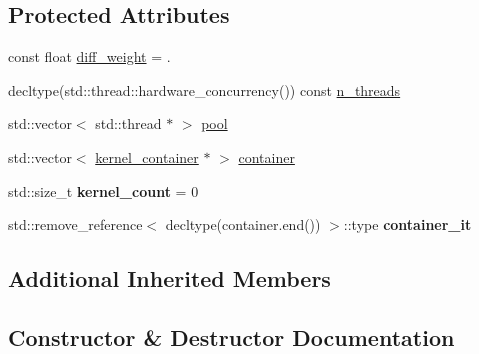 \subsection*{Protected Attributes}
\begin{DoxyCompactItemize}
\item 
const float \hyperlink{classpool__schedule_ad58df45d8f29a1a696338a2beb058b7c}{diff\+\_\+weight} = .
\item 
decltype(std\+::thread\+::hardware\+\_\+concurrency()) const \hyperlink{classpool__schedule_adc11766f8ff9a29b21318bfcf81c815d}{n\+\_\+threads}
\item 
std\+::vector$<$ std\+::thread $\ast$ $>$ \hyperlink{classpool__schedule_ae13c48902fd23d0d8747978780731a04}{pool}
\item 
std\+::vector$<$ \hyperlink{classkernel__container}{kernel\+\_\+container} $\ast$ $>$ \hyperlink{classpool__schedule_a06a6ffb1893da4d486e309f22fe3d83e}{container}
\item 
\hypertarget{classpool__schedule_a91f4b1e58cbbe08986c21d1286f3f98b}{}std\+::size\+\_\+t {\bfseries kernel\+\_\+count} = 0\label{classpool__schedule_a91f4b1e58cbbe08986c21d1286f3f98b}

\item 
\hypertarget{classpool__schedule_a7255a60e82c01a13c18ae69c8831f288}{}std\+::remove\+\_\+reference$<$ decltype(container.\+end()) $>$\+::type {\bfseries container\+\_\+it}\label{classpool__schedule_a7255a60e82c01a13c18ae69c8831f288}

\end{DoxyCompactItemize}
\subsection*{Additional Inherited Members}


\subsection{Constructor \& Destructor Documentation}
\hypertarget{classpool__schedule_a11da62ac9c7b4ea203198ac3bb7babb4}{}
